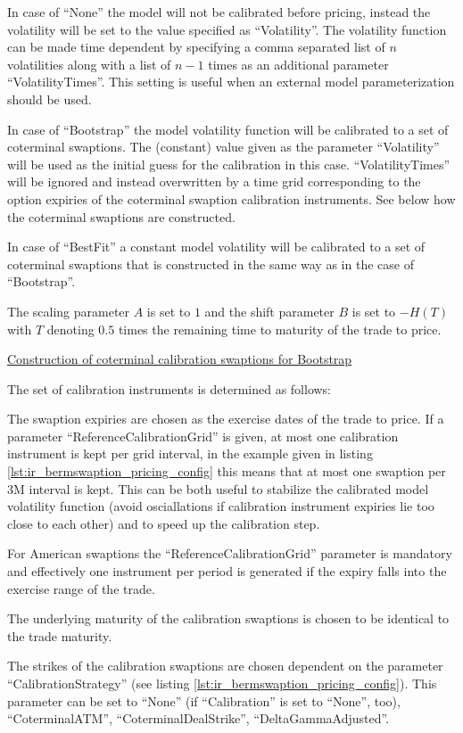 In case of ``None'' the model will not be calibrated before pricing, instead the volatility will be set to the value
specified as ``Volatility''. The volatility function can be made time dependent by specifying a comma separated list of
$n$ volatilities along with a list of $n-1$ times as an additional parameter ``VolatilityTimes''. This setting is useful
when an external model parameterization should be used.

In case of ``Bootstrap'' the model volatility function will be calibrated to a set of coterminal swaptions. The
(constant) value given as the parameter ``Volatility'' will be used as the initial guess for the calibration in this
case. ``VolatilityTimes'' will be ignored and instead overwritten by a time grid corresponding to the option expiries of
the coterminal swaption calibration instruments. See below how the coterminal swaptions are constructed.

In case of ``BestFit'' a constant model volatility will be calibrated to a set of coterminal swaptions that is
constructed in the same way as in the case of ``Bootstrap''.

The scaling parameter $A$ is set to $1$ and the shift parameter $B$ is set to $-H(T)$ with $T$ denoting $0.5$ times the
remaining time to maturity of the trade to price.



\underline{Construction of coterminal calibration swaptions for Bootstrap}

The set of calibration instruments is determined as follows:

The swaption expiries are chosen as the exercise dates of the trade to price. If a parameter
``ReferenceCalibrationGrid'' is given, at most one calibration instrument is kept per grid interval, in the example
given in listing \ref{lst:ir_bermswaption_pricing_config} this means that at most one swaption per 3M interval is kept. This can
be both useful to stabilize the calibrated model volatility function (avoid osciallations if calibration instrument
expiries lie too close to each other) and to speed up the calibration step.

For American swaptions the ``ReferenceCalibrationGrid'' parameter is mandatory and effectively one instrument per period
is generated if the expiry falls into the exercise range of the trade.

The underlying maturity of the calibration swaptions is chosen to be identical to the trade maturity.

The strikes of the calibration swaptions are chosen dependent on the parameter ``CalibrationStrategy'' (see listing
\ref{lst:ir_bermswaption_pricing_config}). This parameter can be set to ``None'' (if ``Calibration'' is set to ``None'',
too), ``CoterminalATM'', ``CoterminalDealStrike'', ``DeltaGammaAdjusted''.

